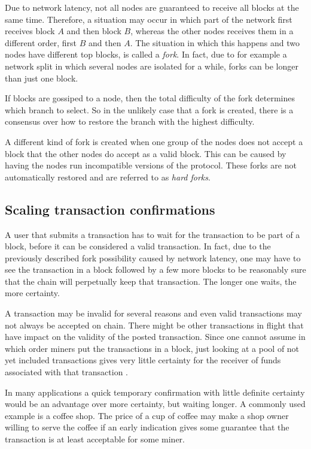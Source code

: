 Due to network latency, not all nodes are guaranteed to receive
all blocks at the same time.  Therefore, a situation may occur in
which part of the network first receives block $A$ and then block $B$,
whereas the other nodes receives them in a different order, first $B$ and then
$A$. The situation in which this happens and two nodes have different
top blocks, is called a \textit{fork}. In fact, due to for example a network
split in which several nodes are isolated for a while, forks can be
longer than just one block.

If blocks are gossiped to a node, then the total
difficulty of the fork determines
which branch to select. So in the unlikely case that a fork is
created, there is a consensus over how to restore the branch with
the highest difficulty.

A different kind of fork is created when one group of the nodes does
not accept a block that the other nodes do accept as a valid block. This
can be caused by having the nodes run incompatible versions of the
protocol. These forks are not
automatically restored and are referred to as \textit{hard forks}.

\subsection{Scaling transaction confirmations}

A user that submits a transaction has to wait for the transaction to
be part of a block, before it can be considered a valid
transaction. In fact, due to the previously described fork possibility
caused by network latency, one may have to see the transaction in a block
followed by a few more blocks to be reasonably sure that the chain will
perpetually keep that transaction. The longer one waits, the more certainty.

A transaction may be invalid for several reasons and even valid
transactions may not always be accepted on chain. There might be other transactions in
flight that have impact on the validity of the posted
transaction. Since one cannot assume in which order miners put
the  transactions in a block, just looking at a pool of not yet
included transactions gives very little certainty for the receiver of
funds associated with that transaction \cite{karame2012double}.

In many applications a quick temporary confirmation with little
definite certainty would be an advantage over more certainty, but
waiting longer. A commonly used example is a coffee shop. The price of
a cup of coffee may make a shop owner willing to serve the coffee if an
early indication gives some guarantee that the transaction is at least
acceptable for some miner.

